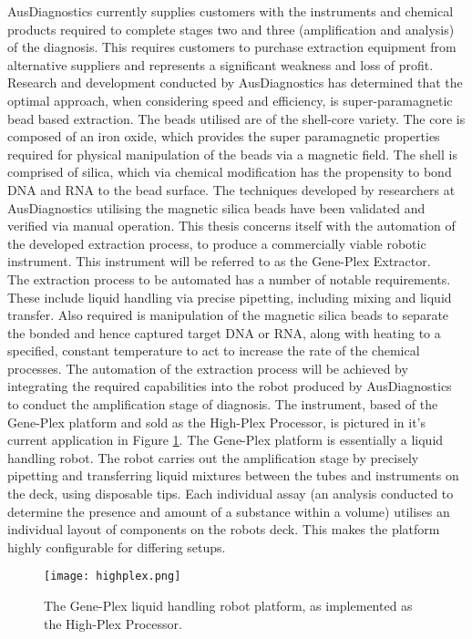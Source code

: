 AusDiagnostics currently supplies customers with the instruments and chemical products required to complete stages two and three (amplification and analysis) of the diagnosis. This requires customers to purchase extraction equipment from alternative suppliers and represents a significant weakness and loss of profit. Research and development conducted by AusDiagnostics has determined that the optimal approach, when considering speed and efficiency, is super-paramagnetic bead based extraction. The beads utilised are of the shell-core variety. The core is composed of an iron oxide, which provides the super paramagnetic properties required for physical manipulation of the beads via a magnetic field. The shell is comprised of silica, which via chemical modification has the propensity to bond DNA and RNA to the bead surface. The techniques developed by researchers at AusDiagnostics utilising the magnetic silica beads have been validated and verified via manual operation. This thesis concerns itself with the automation of the developed extraction process, to produce a commercially viable robotic instrument. This instrument will be referred to as the Gene-Plex Extractor.\\

The extraction process to be automated has a number of notable requirements. These include liquid handling via precise pipetting, including mixing and liquid transfer. Also required is manipulation of the magnetic silica beads to separate the bonded and hence captured target DNA or RNA, along with heating to a specified, constant temperature to act to increase the rate of the chemical processes. The automation of the extraction process will be achieved by integrating the required capabilities into the robot produced by AusDiagnostics to conduct the amplification stage of diagnosis. The instrument, based of the Gene-Plex platform and sold as the High-Plex Processor, is pictured in it's current application in Figure \ref{fig:highplex}. The Gene-Plex platform is essentially a liquid handling robot. The robot carries out the amplification stage by precisely pipetting and transferring liquid mixtures between the tubes and instruments on the deck, using disposable tips. Each individual assay (an analysis conducted to determine the presence and amount of a substance within a volume) utilises an individual layout of components on the robots deck. This makes the platform highly configurable for differing setups.

\begin{figure}[!htb]
	\centering
	\texttt{[image: highplex.png]}
	\caption[High-Plex Platform.]{The Gene-Plex liquid handling robot platform, as implemented as the High-Plex Processor.}
	\label{fig:highplex}
\end{figure} 
\FloatBarrier

